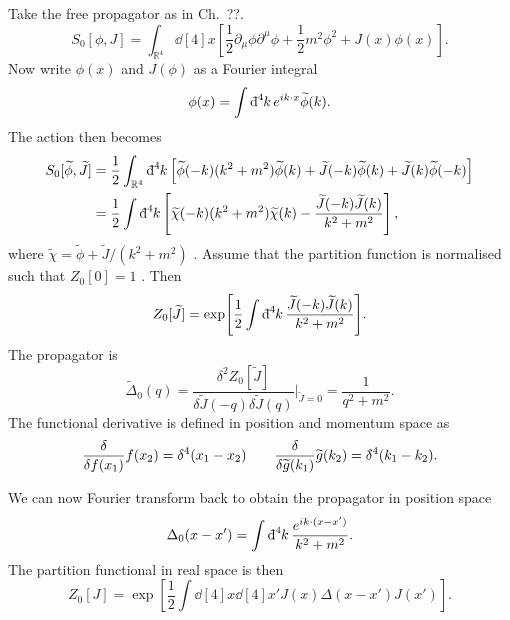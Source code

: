 Take the free propagator as in Ch.~??.
\begin{equation}
  S_0 [\phi, J] = \int_{\mathbb{R}^4} \dd[4]{x}  \left[ \frac{1}{2} \partial_{\mu} \phi \partial^{\mu} \phi + \frac{1}{2} m^2 \phi^2 + J(x) \phi(x) \right].
\end{equation}
Now write $\phi(x)$  and $J(\phi)$ as a Fourier integral
\begin{equation}
  \phi(x) = \int \bdd[4]{k} e^{i k \cdot x} \widetilde{\phi} (k).
\end{equation}
The action then becomes
\begin{align}
  S_0[\widetilde{\phi}, \widetilde{J}] &= \frac{1}{2} \int_{\mathbb{R}^4} \bdd[4]{k} \left[ \widetilde{\phi}(-k) (k^2 + m^2) \widetilde{\phi}(k) + \widetilde{J}(-k) \widetilde{\phi}(k) + \widetilde{J}(k) \widetilde{\phi}(-k) \right] \\
				       &= \frac{1}{2} \int \bdd[4]{k} \left[ \widetilde{\chi}(-k) (k^2 + m^2) \widetilde{\chi}(k) - \frac{\widetilde{J}(-k) \widetilde{J}(k)}{k^2 + m^2} \right],
\end{align}
where $\widetilde{\chi} = \widetilde{\phi} + \widetilde{J} / (k^2+ m^2)$ .
Assume that the partition function is normalised such that $Z_0[0] = 1$ . Then
\begin{equation}
  Z_0[\widetilde{J}] = \exp[\frac{1}{2} \int \bdd[4]{k} \frac{\widetilde{J}(-k) \widetilde{J}(k)}{k^2 + m^2}].
\end{equation}
The propagator is
\begin{equation}
  \widetilde{\Delta}_0(q) = \frac{\delta^2 Z_0 [\widetilde{J}]}{\delta \widetilde{J}(-q) \delta \widetilde{J}(q)} \rvert_{\widetilde{J} = 0} = \frac{1}{q^2 +m^2}.
\end{equation}
The functional derivative is defined in position and momentum space as
\begin{equation}
  \frac{\delta }{\delta f(x_1)} f(x_2) = \delta^{4}(x_1 - x_2) \qquad \frac{\delta }{\delta \widetilde{g}(k_1)} \widetilde{g}(k_2) = \bdelta^{4}(k_1 - k_2).
\end{equation}

We can now Fourier transform back to obtain the propagator in position space
\begin{equation}
  \Delta_0(x - x') = \int \bdd[4]{k} \frac{e^{i k \cdot (x - x')}}{k^2 + m^2}.
\end{equation}
The partition functional in real space is then
\begin{equation}
  Z_0[J] = \exp[\frac{1}{2} \int \dd[4]{x} \dd[4]{x'} J(x) \Delta(x - x') J(x')].
\end{equation}

